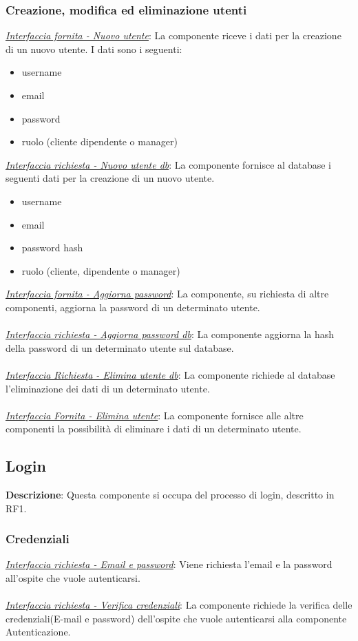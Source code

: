 \documentclass{report}
\begin{document}
\subsubsection*{ \indent  \indent Creazione, modifica ed eliminazione utenti}
\uline{\textit{Interfaccia fornita - Nuovo utente}}: 
La componente riceve i dati per la creazione di un nuovo utente. I dati sono i seguenti:
\begin{itemize}
	\item username
	\item email
	\item password
	\item ruolo (cliente dipendente o manager)
\end{itemize}
\textcolor{Database}{\uline{\textit{Interfaccia richiesta - Nuovo utente db}}}: 
La componente fornisce al database i seguenti dati per la creazione di un nuovo utente.
\begin{itemize}
	\item username
	\item email
	\item password hash
	\item ruolo (cliente, dipendente o manager)
	
\end{itemize}
\uline{\textit{Interfaccia fornita - Aggiorna password}}:
La componente, su richiesta di altre componenti, aggiorna la password di un determinato utente.\\\\
\textcolor{Database}{\uline{\textit{Interfaccia richiesta - Aggiorna password db}}}: 
La componente aggiorna la hash della password di un determinato utente sul database.  \\\\
\textcolor{Database}{\uline{\textit{Interfaccia Richiesta - Elimina utente db}}}: 
La componente richiede al database l'eliminazione dei dati di un determinato utente.\\\\
\uline{\textit{Interfaccia Fornita - Elimina utente}}: 
La componente fornisce alle altre componenti la possibilità di eliminare i dati di un determinato utente.

\subsection*{Login}
\textbf{Descrizione}: Questa componente si occupa del processo di login, descritto in RF1.
\subsubsection*{\indent \indent Credenziali}
\uline{\textit{Interfaccia richiesta - Email e password}}: 
Viene richiesta l'email e la password all'ospite che vuole autenticarsi.\\ \\ 
\uline{\textit{Interfaccia richiesta - Verifica credenziali}}: 
La componente richiede la verifica delle credenziali(E-mail e password) dell'ospite che vuole autenticarsi alla componente Autenticazione.
\end{document}
